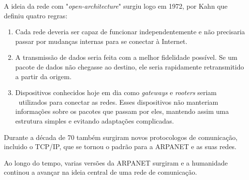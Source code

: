 A ideia da rede com "\textit{open-architecture}" surgiu logo em 1972, por Kahn que 
definiu quatro regras:

\begin{enumerate}
  \item Cada rede deveria ser capaz de funcionar independentemente e não precisaria 
passar por mudanças internas para se conectar à Internet.
  \item A transmissão de dados seria feita com a melhor fidelidade possível. 
Se um pacote de dados não chegasse ao destino, ele seria rapidamente retransmitido a 
partir da origem.
  \item Dispositivos conhecidos hoje em dia como \textit{gateways} e \textit{rooters} seriam \
utilizados para conectar as redes. Esses dispositivos não manteriam informações 
sobre os pacotes que passam por eles, mantendo assim uma  estrutura simples e evitando adaptações complicadas.
\end{enumerate}

Durante a década de 70 também surgiram novos protocologos de comunicação, incluido o TCP/IP, que se
tornou o padrão para a ARPANET e as suas redes.

Ao longo do tempo, varias versões da ARPANET surgiram e a humanidade continou a avançar 
na ideia central de uma rede de comunicação.



